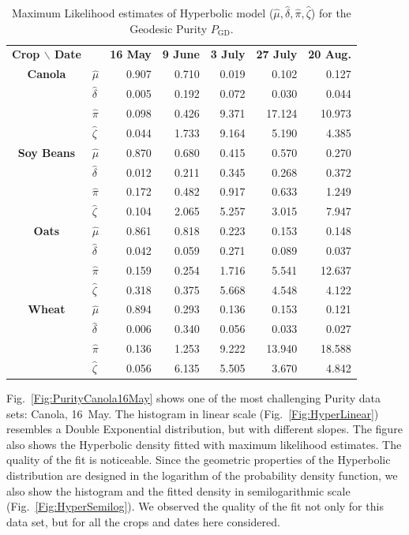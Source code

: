 \documentclass[journal]{IEEEtran}
\begin{document}
{\begin{table}[hbt]
	\centering
	\caption{Maximum Likelihood estimates of Hyperbolic model ($\widehat \mu,\widehat \delta, \widehat \pi, \widehat \zeta$) for the Geodesic Purity $P_{\text{GD}}$.}
	\label{tab:params_purity}
	\setlength{\tabcolsep}{3.8pt}
	\begin{tabular}{clrrrrr}
		\toprule
		\textbf{Crop $\backslash$ Date} & & \textbf{16 May} & \textbf{9 June} & \textbf{3 July} & \textbf{27 July} & \textbf{20 Aug.}\\ \cmidrule{1-2} \cmidrule(lr){3-3} \cmidrule(lr){4-4} \cmidrule(lr){5-5} \cmidrule(lr){6-6} \cmidrule(lr){7-7}
		\textbf{Canola}     
		& $\widehat{\mu}$ & 0.907& 0.710& 0.019& 0.102 & 0.127\\
		& $\widehat{\delta}$ & 0.005& 0.192& 0.072& 0.030& 0.044  \\
		& $\widehat{\pi}$ &  0.098&  0.426&  9.371& 17.124& 10.973\\
		& $\widehat{\zeta}$ & 0.044& 1.733& 9.164& 5.190& 4.385\\
		\midrule
		\textbf{Soy Beans}
		& $\widehat{\mu}$ & 0.870& 0.680& 0.415& 0.570& 0.270 \\
		& $\widehat{\delta}$ & 0.012& 0.211& 0.345& 0.268& 0.372 \\
		& $\widehat{\pi}$ & 0.172& 0.482& 0.917& 0.633& 1.249 \\
		& $\widehat{\zeta}$ & 0.104& 2.065& 5.257& 3.015& 7.947 \\
		\midrule
		\textbf{Oats}
		& $\widehat{\mu}$ & 0.861& 0.818& 0.223& 0.153& 0.148 \\
		& $\widehat{\delta}$ & 0.042& 0.059& 0.271& 0.089& 0.037 \\
		& $\widehat{\pi}$ & 0.159&  0.254&  1.716&  5.541& 12.637 \\
		& $\widehat{\zeta}$ & 0.318& 0.375& 5.668& 4.548& 4.122 \\
		\midrule
		\textbf{Wheat} 
		& $\widehat{\mu}$ & 0.894& 0.293& 0.136& 0.153& 0.121 \\
		& $\widehat{\delta}$ & 0.006& 0.340& 0.056& 0.033& 0.027 \\
		& $\widehat{\pi}$ & 0.136&  1.253&  9.222& 13.940& 18.588 \\
		& $\widehat{\zeta}$ & 0.056& 6.135& 5.505& 3.670& 4.842 \\
		\bottomrule
	\end{tabular}
\end{table}

Fig.~\ref{Fig:PurityCanola16May} shows one of the most challenging Purity data sets: Canola, 16~May.
The histogram in linear scale (Fig.~\ref{Fig:HyperLinear}) resembles a Double Exponential distribution, but with different slopes.
The figure also shows the Hyperbolic density fitted with maximum likelihood estimates.
The quality of the fit is noticeable.
Since the geometric properties of the Hyperbolic distribution are designed in the logarithm of the probability density function, we also show the histogram and the fitted density in semilogarithmic scale (Fig.~\ref{Fig:HyperSemilog}).
We observed the quality of the fit not only for this data set, but for all the crops and dates here considered.

}
\end{document}
